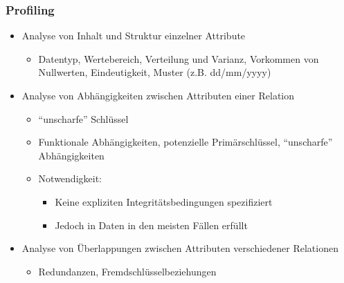     
    
    
    \begin{frame}
    \frametitle{Profiling}
    
    \begin{itemize}
    \item Analyse von Inhalt und Struktur einzelner Attribute
    \begin{itemize}
    \item Datentyp, Wertebereich, Verteilung und Varianz, Vorkommen von
      Nullwerten, Eindeutigkeit, Muster (z.B. dd/mm/yyyy) 
    \end{itemize}
    \item Analyse von Abhängigkeiten zwischen Attributen einer Relation
    \begin{itemize}
    \item "`unscharfe"' Schlüssel
    \item Funktionale Abhängigkeiten, potenzielle Primärschlüssel,
      "`unscharfe"' Abhängigkeiten 
    \item Notwendigkeit:
    \begin{itemize}
    \item Keine expliziten Integritätsbedingungen spezifiziert
    \item Jedoch in Daten in den meisten Fällen erfüllt
    \end{itemize}
    \end{itemize}
    \item Analyse von Überlappungen zwischen Attributen verschiedener Relationen
    \begin{itemize}
    \item Redundanzen, Fremdschlüsselbeziehungen
    \end{itemize}
    \end{itemize}
    
    \end{frame}
    
    
